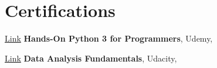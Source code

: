 \documentclass{modern} %
\begin{document}
\section{Certifications}
\begin{twocolentry}{
    {\href{http://ude.my/UC{-}4c270090{-}4c59{-}40f1{-}9f86{-}39118cd811f4}{Link}}
}
    \textbf{Hands{-}On Python 3 for Programmers}, Udemy, {}
\end{twocolentry}
\begin{twocolentry}{
    {\href{http://confirm.udacity.com/XQMHNDEK}{Link}}
}
    \textbf{Data Analysis Fundamentals}, Udacity, {}
\end{twocolentry}










\end{document}

